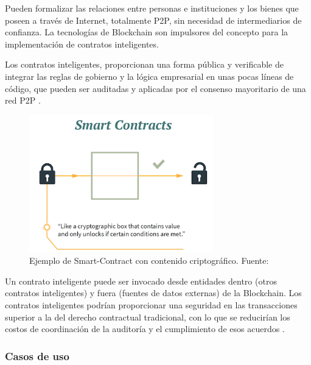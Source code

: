\vspace{5mm}

\noindent Pueden formalizar las relaciones entre personas e instituciones y los bienes que poseen a través de Internet, 
totalmente P2P, sin necesidad de intermediarios de confianza. La tecnologías de Blockchain son impulsores del concepto 
para la implementación de contratos inteligentes.

\vspace{5mm}

\noindent Los contratos inteligentes, proporcionan una forma pública y verificable de integrar las reglas de gobierno y 
la lógica empresarial en unas pocas líneas de código, que pueden ser auditadas y aplicadas por el consenso mayoritario 
de una red P2P \cite{what-is-smart-contract}.

\vspace{5mm}

\begin{figure}[ht!]
    \centering
    \includegraphics[width=8cm]{imagenes/herramientas/smart-contracts}
    \caption{Ejemplo de Smart-Contract con contenido criptográfico. Fuente: \cite{what-is-smart-contract}}
\end{figure}

\vspace{5mm}

\noindent Un contrato inteligente puede ser invocado desde entidades dentro (otros contratos inteligentes) y fuera 
(fuentes de datos externas) de la Blockchain. Los contratos inteligentes podrían proporcionar una seguridad en las 
transacciones superior a la del derecho contractual tradicional, con lo que se reducirían los costos de coordinación 
de la auditoría y el cumplimiento de esos acuerdos \cite{what-is-smart-contract}. 

\subsubsection*{Casos de uso}

